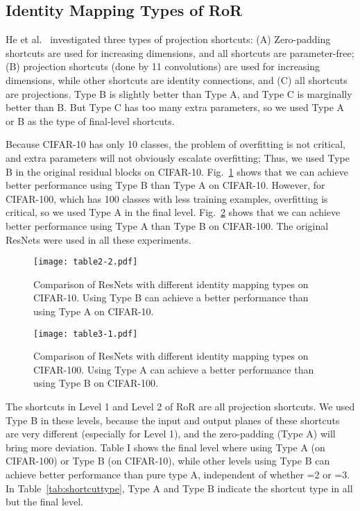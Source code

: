 \documentclass[journal]{IEEEtran}
\begin{document}
\subsection{Identity Mapping Types of RoR}
He et al.~\cite{he2015resnets} investigated three types of projection shortcuts: (A) Zero-padding shortcuts are used for increasing dimensions, and all shortcuts are parameter-free; (B) projection shortcuts (done by 11 convolutions) are used for increasing dimensions, while other shortcuts are identity connections, and (C) all shortcuts are projections. Type B is slightly better than Type A, and Type C is marginally better than B. But Type C has too many extra parameters, so we used Type A or B as the type of final-level shortcuts. 
\par 
Because CIFAR-10 has only 10 classes, the problem of overfitting is not critical, and extra parameters will not obviously escalate overfitting; Thus, we used Type B in the original residual blocks on CIFAR-10. Fig.~\ref{fig:mappingtype10} shows that we can achieve better performance using Type B than Type A on CIFAR-10. However, for CIFAR-100, which has 100 classes with less training examples, overfitting is critical, so we used Type A in the final level. Fig.~\ref{fig:mappingtype100} shows that we can achieve better performance using Type A than Type B on CIFAR-100. The original ResNets were used in all these experiments.
\begin{figure}
\centering
\texttt{[image: table2-2.pdf]}
\caption{Comparison of ResNets with different identity mapping types on CIFAR-10. Using Type B can achieve a better performance than using Type A on CIFAR-10.}
\label{fig:mappingtype10}
\end{figure}    
\begin{figure}
\centering
\texttt{[image: table3-1.pdf]}
\caption{Comparison of ResNets with different identity mapping types on CIFAR-100. Using Type A can achieve a better performance than using Type B on CIFAR-100.}
\label{fig:mappingtype100}
\end{figure}   
\par 
The shortcuts in Level 1 and Level 2 of RoR are all projection shortcuts. We used Type B in these levels, because the input and output planes of these shortcuts are very different (especially for Level 1), and the zero-padding (Type A) will bring more deviation. Table I shows  the final level where using Type A (on CIFAR-100) or Type B (on CIFAR-10), while other levels using Type B can achieve better performance than pure type A, independent of whether =2 or =3. In Table~\ref{tab:shortcuttype}, Type A and Type B indicate the shortcut type in all but the final level.
\end{document}
